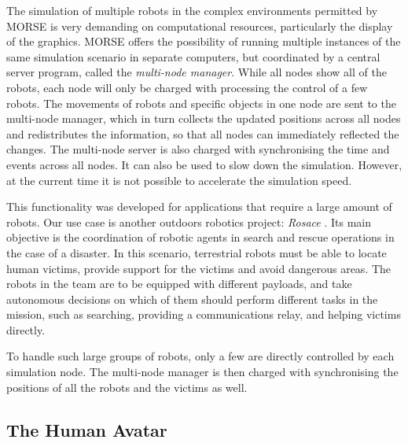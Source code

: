 \documentclass{llncs}
\begin{document}
The simulation of multiple robots in the complex environments permitted by
MORSE is very demanding on computational resources, particularly the
display of the graphics. MORSE offers the possibility of running multiple
instances of the same simulation scenario in separate computers, but
coordinated by a central server program, called the \emph{multi-node
manager}. While all nodes show all of the robots, each node will only
be charged with processing the control of a few robots. The movements
of robots and specific objects in one node are sent to the multi-node
manager, which in turn collects the updated positions across all nodes
and redistributes the information, so that all nodes can immediately
reflected the changes.  The multi-node server is also charged with
synchronising the time and events across all nodes. It can also be used
to slow down the simulation. However, at the current time it is not
possible to accelerate the simulation speed.

This functionality was developed for applications that require a large amount
of robots. Our use case is another outdoors robotics project: \emph{Rosace}
\cite{springerlink:10.1007/978-3-642-12384-9_18,springerlink:10.1007/978-3-642-28786-2_32}.
Its main objective is the coordination of robotic agents in search and rescue
operations in the case of a disaster. In this scenario, terrestrial robots must
be able to locate human victims, provide support for the victims and avoid
dangerous areas. The robots in the team are to be equipped with different
payloads, and take autonomous decisions on which of them should perform
different tasks in the mission, such as searching, providing a communications
relay, and helping victims directly.

To handle such large groups of robots, only a few are directly controlled by
each simulation node. The multi-node manager is then charged with synchronising
the positions of all the robots and the victims as well.




\subsection{The Human Avatar}
\label{section:human}
\end{document}
